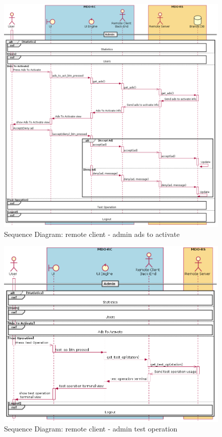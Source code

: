 \begin{figure}[htb!]
\centering
    \includegraphics[width=1\columnwidth]{./img/seq-rc-admin-ads-to-act.png}
  \caption{Sequence Diagram: remote client - admin ads to activate}%
\label{fig:seq-rc-admin-ads-to-act}
\end{figure}

\begin{figure}[htb!]
\centering
    \includegraphics[width=1\columnwidth]{./img/seq-rc-admin-test-op.png}
  \caption{Sequence Diagram: remote client - admin test operation}%
\label{fig:seq-rc-admin-test-op}
\end{figure}

